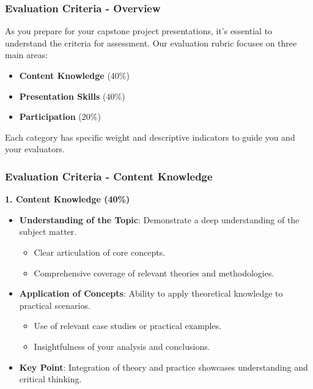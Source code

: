 \documentclass{beamer}
\begin{document}
\begin{frame}[fragile]
    \frametitle{Evaluation Criteria - Overview}
    As you prepare for your capstone project presentations, it’s essential to understand the criteria for assessment. 
    Our evaluation rubric focuses on three main areas: 
    \begin{itemize}
        \item \textbf{Content Knowledge} (40\%)
        \item \textbf{Presentation Skills} (40\%)
        \item \textbf{Participation} (20\%)
    \end{itemize}
    Each category has specific weight and descriptive indicators to guide you and your evaluators.
\end{frame}

\begin{frame}[fragile]
    \frametitle{Evaluation Criteria - Content Knowledge}
    \textbf{1. Content Knowledge (40\%)}

    \begin{itemize}
        \item \textbf{Understanding of the Topic}: Demonstrate a deep understanding of the subject matter.
        \begin{itemize}
            \item Clear articulation of core concepts.
            \item Comprehensive coverage of relevant theories and methodologies.
        \end{itemize}
        
        \item \textbf{Application of Concepts}: Ability to apply theoretical knowledge to practical scenarios.
        \begin{itemize}
            \item Use of relevant case studies or practical examples.
            \item Insightfulness of your analysis and conclusions.
        \end{itemize}
        
        \item \textbf{Key Point}: Integration of theory and practice showcases understanding and critical thinking.
    \end{itemize}
\end{frame}
\end{document}
